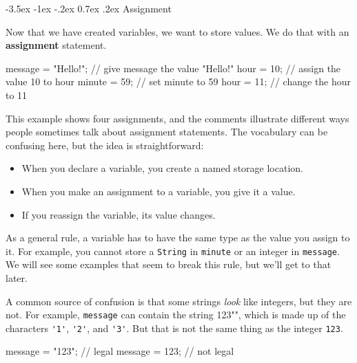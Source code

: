 \documentclass[12pt]{book}
\makeatletter
\theoremstyle{exercise}
\newcommand{\java}[1]{\verb"#1"}
\renewcommand{\section}{\@startsection{section}{1}{\z@}%
    {-3.5ex \@plus -1ex \@minus -.2ex}%
    {0.7ex \@plus.2ex}%
    {\normalfont\Large\bfseries}}
\newcommand{\java}[1]{\lstinline{#1}} %
\makeatother
\begin{document}
\section{Assignment}


Now that we have created variables, we want to store values.
We do that with an {\bf assignment} statement.

\begin{code}
    message = "Hello!";  // give message the value "Hello!"
    hour = 10;           // assign the value 10 to hour
    minute = 59;         // set minute to 59
    hour = 11;           // change the hour to 11
\end{code}

This example shows four assignments, and the comments illustrate different ways people sometimes talk about assignment statements.
The vocabulary can be confusing here, but the idea is straightforward:

\begin{itemize}
\item When you declare a variable, you create a named storage location.
\item When you make an assignment to a variable, you give it a value.
\item If you reassign the variable, its value changes.
\end{itemize}

As a general rule, a variable has to have the same type as the value you assign to it.
For example, you cannot store a \java{String} in \java{minute} or an integer in \java{message}.
We will see some examples that seem to break this rule, but we'll get to that later.


A common source of confusion is that some strings {\em look} like integers, but they are not.
For example, \java{message} can contain the string \java{"123"}, which is made up of the characters \java{'1'}, \java{'2'}, and \java{'3'}.
But that is not the same thing as the integer \java{123}.

\begin{code}
    message = "123";  // legal
    message = 123;    // not legal
\end{code}
\end{document}
